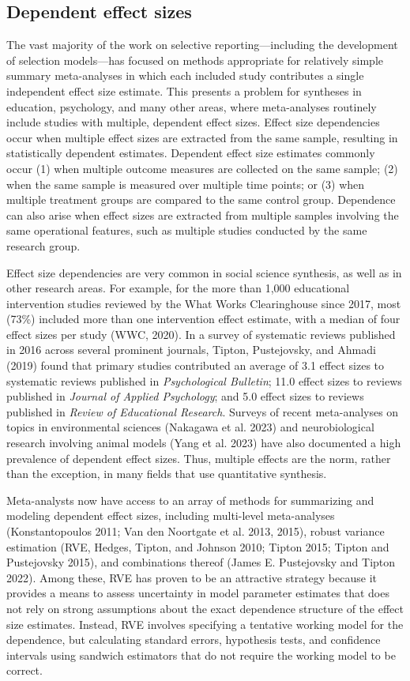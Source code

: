 \documentclass[
]{article}
\begin{document}
\subsection{Dependent effect sizes}\label{dependent-effect-sizes}

The vast majority of the work on selective reporting---including the
development of selection models---has focused on methods appropriate for
relatively simple summary meta-analyses in which each included study
contributes a single independent effect size estimate. This presents a
problem for syntheses in education, psychology, and many other areas,
where meta-analyses routinely include studies with multiple, dependent
effect sizes. Effect size dependencies occur when multiple effect sizes
are extracted from the same sample, resulting in statistically dependent
estimates. Dependent effect size estimates commonly occur (1) when
multiple outcome measures are collected on the same sample; (2) when the
same sample is measured over multiple time points; or (3) when multiple
treatment groups are compared to the same control group. Dependence can
also arise when effect sizes are extracted from multiple samples
involving the same operational features, such as multiple studies
conducted by the same research group.

Effect size dependencies are very common in social science synthesis, as
well as in other research areas. For example, for the more than 1,000
educational intervention studies reviewed by the What Works
Clearinghouse since 2017, most (73\%) included more than one
intervention effect estimate, with a median of four effect sizes per
study (WWC, 2020). In a survey of systematic reviews published in 2016
across several prominent journals, Tipton, Pustejovsky, and Ahmadi
(2019) found that primary studies contributed an average of 3.1 effect
sizes to systematic reviews published in \emph{Psychological Bulletin};
11.0 effect sizes to reviews published in \emph{Journal of Applied
Psychology}; and 5.0 effect sizes to reviews published in \emph{Review
of Educational Research}. Surveys of recent meta-analyses on topics in
environmental sciences (Nakagawa et al. 2023) and neurobiological
research involving animal models (Yang et al. 2023) have also documented
a high prevalence of dependent effect sizes. Thus, multiple effects are
the norm, rather than the exception, in many fields that use
quantitative synthesis.

Meta-analysts now have access to an array of methods for summarizing and
modeling dependent effect sizes, including multi-level meta-analyses
(Konstantopoulos 2011; Van den Noortgate et al. 2013, 2015), robust
variance estimation (RVE, Hedges, Tipton, and Johnson 2010; Tipton 2015;
Tipton and Pustejovsky 2015), and combinations thereof (James E.
Pustejovsky and Tipton 2022). Among these, RVE has proven to be an
attractive strategy because it provides a means to assess uncertainty in
model parameter estimates that does not rely on strong assumptions about
the exact dependence structure of the effect size estimates. Instead,
RVE involves specifying a tentative working model for the dependence,
but calculating standard errors, hypothesis tests, and confidence
intervals using sandwich estimators that do not require the working
model to be correct.
\end{document}
